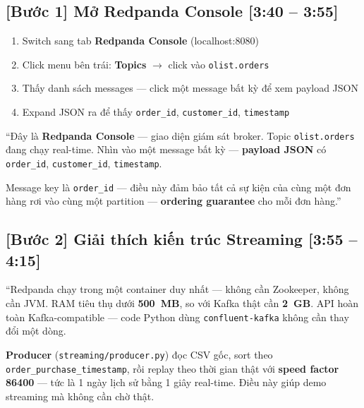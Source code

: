 \documentclass[12pt, a4paper]{article}
\newenvironment{speakerbox}[2]{%
  \begin{tcolorbox}[
    enhanced, breakable,
    colback=#1!6!white, colframe=#1,
    colbacktitle=#1, coltitle=white,
    fonttitle=\bfseries\large,
    title={#2},
    arc=4pt, boxrule=1.5pt,
    left=8pt, right=8pt, top=6pt, bottom=6pt,
  ]
}{\end{tcolorbox}}
\newcommand{\timing}[1]{\hfill{\small\bfseries\color{gray}[#1]}}
\newcommand{\code}[1]{\texttt{\small#1}}
\begin{document}
\begin{speakerbox}{p2color}{\faUser\ Người 2 \textbullet\ 3:40 -- 4:30 \textbullet\ DEMO + Lời nói}

\subsection*{[Bước 1] Mở Redpanda Console \timing{3:40 -- 3:55}}

\begin{demobox}
\begin{enumerate}[leftmargin=1.5em, itemsep=4pt]
  \item Switch sang tab \textbf{Redpanda Console} (localhost:8080)
  \item Click menu bên trái: \textbf{Topics} $\to$ click vào \code{olist.orders}
  \item Thấy danh sách messages --- click một message bất kỳ để xem payload JSON
  \item Expand JSON ra để thấy \code{order\_id}, \code{customer\_id}, \code{timestamp}
\end{enumerate}
\end{demobox}

\begin{scriptbox}
``Đây là \textbf{Redpanda Console} --- giao diện giám sát broker. Topic
\code{olist.orders} đang chạy real-time. Nhìn vào một message bất kỳ ---
\textbf{payload JSON} có \code{order\_id}, \code{customer\_id}, \code{timestamp}.

Message key là \texttt{order\_id} --- điều này đảm bảo tất cả sự kiện
của cùng một đơn hàng rơi vào cùng một partition --- \textbf{ordering
guarantee} cho mỗi đơn hàng.''
\end{scriptbox}

\subsection*{[Bước 2] Giải thích kiến trúc Streaming \timing{3:55 -- 4:15}}

\begin{scriptbox}
``Redpanda chạy trong một container duy nhất --- không cần Zookeeper, không
cần JVM. RAM tiêu thụ dưới \textbf{500~MB}, so với Kafka thật cần \textbf{2~GB}.
API hoàn toàn Kafka-compatible --- code Python dùng \code{confluent-kafka} không cần
thay đổi một dòng.

\textbf{Producer} (\code{streaming/producer.py}) đọc CSV gốc, sort theo
\code{order\_purchase\_timestamp}, rồi replay theo thời gian thật với
\textbf{speed factor 86400} --- tức là 1 ngày lịch sử bằng 1 giây
real-time. Điều này giúp demo streaming mà không cần chờ thật.


\end{scriptbox}
\end{speakerbox}
\end{document}
